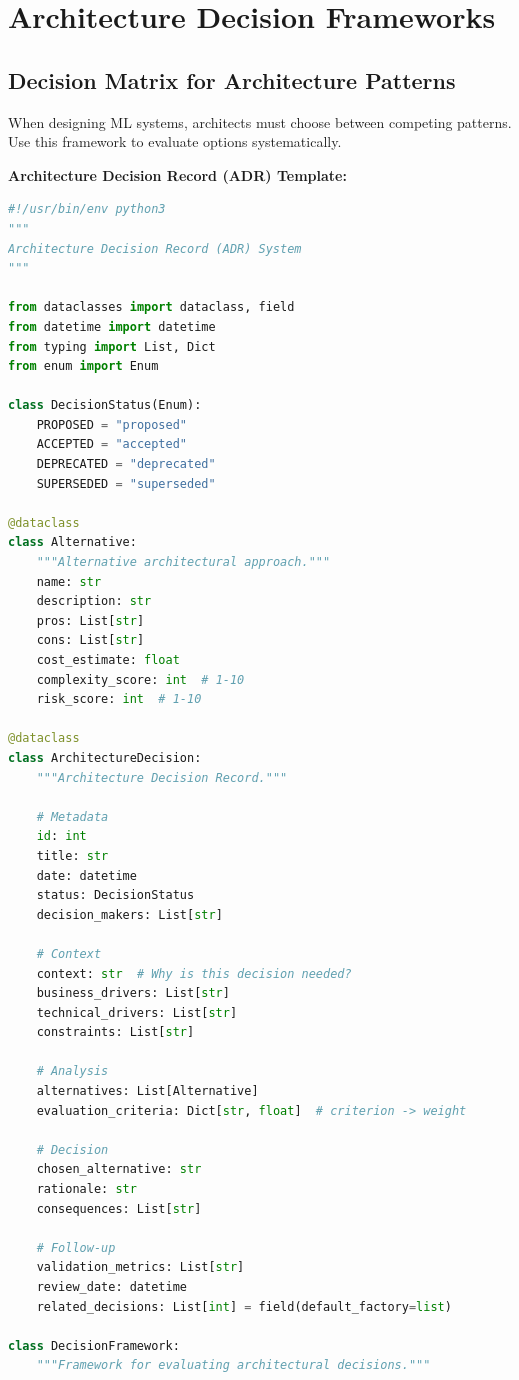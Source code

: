 \section{Architecture Decision Frameworks}

\subsection{Decision Matrix for Architecture Patterns}

When designing ML systems, architects must choose between competing patterns. Use this framework to evaluate options systematically.

\textbf{Architecture Decision Record (ADR) Template:}

\begin{lstlisting}[language=Python, caption=ADR Implementation]
#!/usr/bin/env python3
"""
Architecture Decision Record (ADR) System
"""

from dataclasses import dataclass, field
from datetime import datetime
from typing import List, Dict
from enum import Enum

class DecisionStatus(Enum):
    PROPOSED = "proposed"
    ACCEPTED = "accepted"
    DEPRECATED = "deprecated"
    SUPERSEDED = "superseded"

@dataclass
class Alternative:
    """Alternative architectural approach."""
    name: str
    description: str
    pros: List[str]
    cons: List[str]
    cost_estimate: float
    complexity_score: int  # 1-10
    risk_score: int  # 1-10

@dataclass
class ArchitectureDecision:
    """Architecture Decision Record."""

    # Metadata
    id: int
    title: str
    date: datetime
    status: DecisionStatus
    decision_makers: List[str]

    # Context
    context: str  # Why is this decision needed?
    business_drivers: List[str]
    technical_drivers: List[str]
    constraints: List[str]

    # Analysis
    alternatives: List[Alternative]
    evaluation_criteria: Dict[str, float]  # criterion -> weight

    # Decision
    chosen_alternative: str
    rationale: str
    consequences: List[str]

    # Follow-up
    validation_metrics: List[str]
    review_date: datetime
    related_decisions: List[int] = field(default_factory=list)

class DecisionFramework:
    """Framework for evaluating architectural decisions."""


\end{lstlisting}
